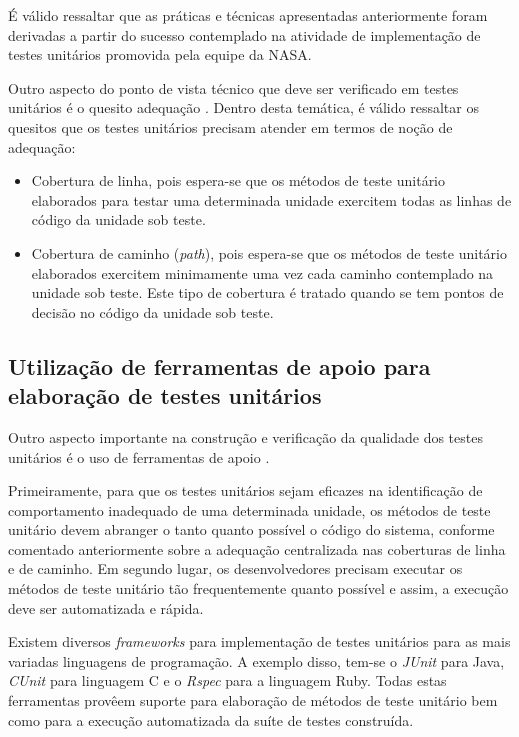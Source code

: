 É válido ressaltar que as práticas e técnicas apresentadas anteriormente foram derivadas a partir do sucesso contemplado na atividade de implementação de testes unitários promovida pela equipe da NASA.

Outro aspecto do ponto de vista técnico que deve ser verificado em testes unitários é o quesito adequação \cite{adequacao}. Dentro desta temática, é válido ressaltar os quesitos que os testes unitários precisam atender em termos de noção de adequação:

\begin{itemize}
	\item Cobertura de linha, pois espera-se que os métodos de teste unitário elaborados para testar uma determinada unidade exercitem todas as linhas de código da unidade sob teste.
	\item Cobertura de caminho (\textit{path}), pois espera-se que os métodos de teste unitário elaborados exercitem minimamente uma vez cada caminho contemplado na unidade sob teste. Este tipo de cobertura é tratado quando se tem pontos de decisão no código da unidade sob teste.
\end{itemize}

\subsection{Utilização de ferramentas de apoio para elaboração de testes unitários}

Outro aspecto importante na construção e verificação da qualidade dos testes unitários é o uso de ferramentas de apoio \cite{feedback}.

Primeiramente, para que os testes unitários sejam eficazes na identificação de comportamento inadequado de uma determinada unidade, os métodos de teste unitário devem abranger o tanto quanto possível o código do sistema, conforme comentado anteriormente sobre a adequação centralizada nas coberturas de linha e de caminho. Em segundo lugar, os desenvolvedores precisam executar os métodos de teste unitário tão frequentemente quanto possível e assim, a execução deve ser automatizada e rápida.

Existem diversos \textit{frameworks} para implementação de testes unitários para as mais variadas linguagens de programação. A exemplo disso, tem-se o \textit{JUnit} para Java, \textit{CUnit} para linguagem C e o \textit{Rspec} para a linguagem Ruby. Todas estas ferramentas provêem suporte para elaboração de métodos de teste unitário bem como para a execução automatizada da suíte de testes construída.

